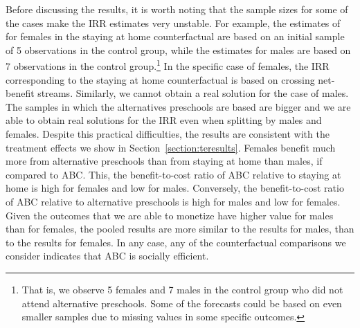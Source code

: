 \noindent Before discussing the results, it is worth noting that the sample sizes for some of the cases make the IRR estimates very unstable. For example, the estimates of for females in the staying at home counterfactual are based on an initial sample of 5 observations in the control group, while the estimates for males are based on 7  observations in the control group.\footnote{That is, we observe 5 females and 7 males in the control group who did not attend alternative preschools. Some of the forecasts could be based on even smaller samples due to missing values in some specific outcomes.} In the specific case of females, the IRR corresponding to the staying at home counterfactual is based on crossing net-benefit streams. Similarly, we cannot obtain a real solution for the case of males.\\ 

\noindent The samples in which the alternatives preschools are based are bigger and we are able to obtain real solutions for the IRR even when splitting by males and females. Despite this practical difficulties, the results are consistent with the treatment effects we show in Section~\ref{section:teresults}. Females benefit much more from alternative preschools than from staying at home than males, if compared to ABC. This, the benefit-to-cost ratio of ABC relative to staying at home is high for females and low for males. Conversely, the benefit-to-cost ratio of ABC relative to alternative preschools is high for males and low for females. Given the outcomes that we are able to monetize have higher value for males than for females, the pooled results are more similar to the results for males, than to the results for females. In any case, any of the counterfactual comparisons we consider indicates that ABC is socially efficient. 

